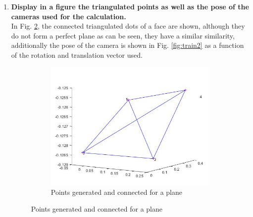 \documentclass[12pt, twoside]{report}
\begin{document}
\begin{enumerate}
\begin{lstlisting}[language=Matlab, numbers=none]
    Ap1=skew1*imgKc;% A matrix is 3x4  for image 1
    clear Ap
    Ap2=skew2*imgKc*T2; % Ap matrix is 3x4 for image 2
    for i=1:size(pts1,1)% for each point
        %skew matrix of pts1 
        skew1=[0 0 pts1(i,2); 0 0 -pts1(i,1); -pts1(i,2) pts1(i,1) 0];
        %skew matrix of pts2
        skew2=[0 0 pts2(i,2); 0 0 -pts2(i,1); -pts2(i,2) pts2(i,1) 0];
        Ap1=skew1*imgKc;
        Ap2=skew2*imgKc*T2;
        % A matrix is 6x4
        A = [Ap1; Ap2];
        [U,S,V] = svd(A);
        % the last column of V is the solution
        pts3D(i,:) = V(:,end);
        pts3D(i,:) = pts3D(i,:)/pts3D(i,4);% normalize the 3D point
    end
%Normalize the 3D points
    %pts3D = pts3D./repmat(pts3D(:,4),1,4);
    %pts3D = pts3D(:,1:3);
end
\end{lstlisting}


\item \textbf{Display in a figure the triangulated points as well as the pose of the cameras used for the calculation.}\\
In Fig. \ref{fig:trian1}, the connected triangulated dots of a face are shown, although they do not form a perfect plane as can be seen, they have a similar similarity, additionally the pose of the camera is shown in Fig. \ref{fig:train2} as a function of the rotation and translation vector used.
\begin{figure}[H]
     \centering
     \begin{subfigure}[b]{0.45\textwidth}
         \centering
         \includegraphics[width=\textwidth]{images/tp_3/points_connected.jpg}
             \caption{Points generated and connected for a plane}
         \label{fig:trian1}

\end{subfigure}
\end{figure}
\end{enumerate}
\end{document}
